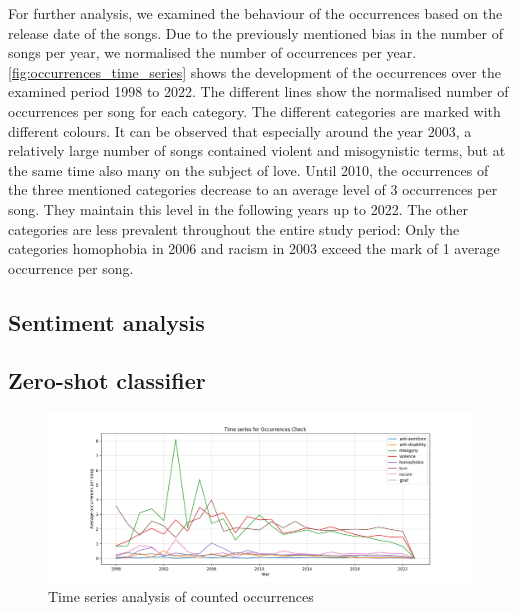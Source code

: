 For further analysis, we examined the behaviour of the occurrences based on the release date of the songs. Due to the previously mentioned bias in the number of songs per year, we normalised the number of occurrences per year. \autoref{fig:occurrences_time_series} shows the development of the occurrences over the examined period 1998 to 2022. The different lines show the normalised number of occurrences per song for each category. The different categories are marked with different colours. It can be observed that especially around the year 2003, a relatively large number of songs contained violent and misogynistic terms, but at the same time also many on the subject of love. Until 2010, the occurrences of the three mentioned categories decrease to an average level of 3 occurrences per song. They maintain this level in the following years up to 2022. The other categories are less prevalent throughout the entire study period: Only the categories homophobia in 2006 and racism in 2003 exceed the mark of 1 average occurrence per song.

\subsection*{Sentiment analysis}



\subsection*{Zero-shot classifier}

\begin{figure}[!htb]
    \centering
    \includegraphics[width=\textwidth]{figures/time_series_occurrences.png}
    \caption{Time series analysis of counted occurrences}
    \label{fig:occurrences_time_series}
\end{figure}



